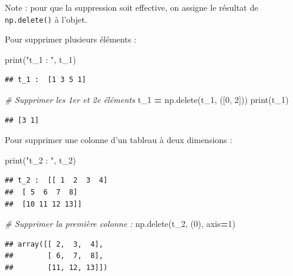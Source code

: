 \documentclass[
  12pt,
]{book}
\newenvironment{Shaded}{\begin{snugshade}}{\end{snugshade}}
\newcommand{\BuiltInTok}[1]{#1}
\newcommand{\CommentTok}[1]{\textcolor[rgb]{0.56,0.35,0.01}{\textit{#1}}}
\newcommand{\DecValTok}[1]{\textcolor[rgb]{0.00,0.00,0.81}{#1}}
\newcommand{\NormalTok}[1]{#1}
\newcommand{\OperatorTok}[1]{\textcolor[rgb]{0.81,0.36,0.00}{\textbf{#1}}}
\newcommand{\StringTok}[1]{\textcolor[rgb]{0.31,0.60,0.02}{#1}}
\numberwithin{equation}{section}
\numberwithin{countremarque}{section}
\begin{document}
Note : pour que la suppression soit effective, on assigne le résultat de \texttt{np.delete()} à l'objet.

Pour supprimer plusieurs éléments :

\begin{Shaded}
\begin{Highlighting}[]
\BuiltInTok{print}\NormalTok{(}\StringTok{"t\_1 : "}\NormalTok{, t\_1)}
\end{Highlighting}
\end{Shaded}

\begin{lstlisting}
## t_1 :  [1 3 5 1]
\end{lstlisting}

\begin{Shaded}
\begin{Highlighting}[]
\CommentTok{\# Supprimer les 1er et 2e éléments}
\NormalTok{t\_1 }\OperatorTok{=}\NormalTok{ np.delete(t\_1, ([}\DecValTok{0}\NormalTok{, }\DecValTok{2}\NormalTok{]))}
\BuiltInTok{print}\NormalTok{(t\_1)}
\end{Highlighting}
\end{Shaded}

\begin{lstlisting}
## [3 1]
\end{lstlisting}

Pour supprimer une colonne d'un tableau à deux dimensions :

\begin{Shaded}
\begin{Highlighting}[]
\BuiltInTok{print}\NormalTok{(}\StringTok{"t\_2 : "}\NormalTok{, t\_2)}
\end{Highlighting}
\end{Shaded}

\begin{lstlisting}
## t_2 :  [[ 1  2  3  4]
##  [ 5  6  7  8]
##  [10 11 12 13]]
\end{lstlisting}

\begin{Shaded}
\begin{Highlighting}[]
\CommentTok{\# Supprimer la première colonne :}
\NormalTok{np.delete(t\_2, (}\DecValTok{0}\NormalTok{), axis}\OperatorTok{=}\DecValTok{1}\NormalTok{)}
\end{Highlighting}
\end{Shaded}

\begin{lstlisting}
## array([[ 2,  3,  4],
##        [ 6,  7,  8],
##        [11, 12, 13]])
\end{lstlisting}
\end{document}
